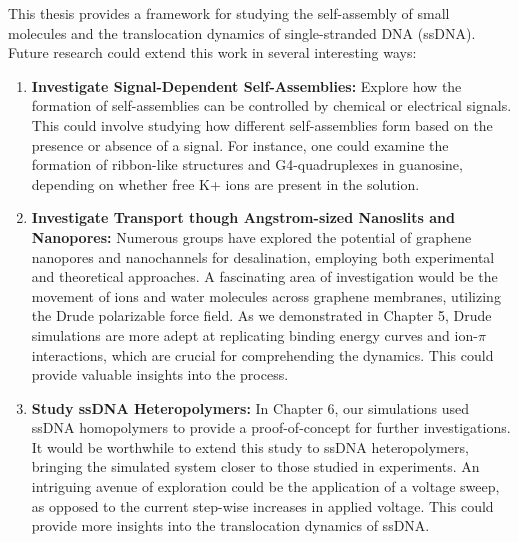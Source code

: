 This thesis provides a framework for studying the self-assembly of small molecules and the translocation dynamics of single-stranded DNA (ssDNA). Future research could extend this work in several interesting ways:
\begin{enumerate}
    \item \textbf{Investigate Signal-Dependent Self-Assemblies:} Explore how the formation of self-assemblies can be controlled by chemical or electrical signals. This could involve studying how different self-assemblies form based on the presence or absence of a signal. For instance, one could examine the formation of ribbon-like structures and G4-quadruplexes in guanosine, depending on whether free K+ ions are present in the solution. 

    \item \textbf{Investigate Transport though Angstrom-sized Nanoslits and Nanopores:} Numerous groups have explored the potential of graphene nanopores and nanochannels for desalination, employing both experimental and theoretical approaches. A fascinating area of investigation would be the movement of ions and water molecules across graphene membranes, utilizing the Drude polarizable force field. As we demonstrated in Chapter 5, Drude simulations are more adept at replicating binding energy curves and ion-$\pi$ interactions, which are crucial for comprehending the dynamics. This could provide valuable insights into the process.

    \item \textbf{Study ssDNA Heteropolymers:} In Chapter 6, our simulations used ssDNA homopolymers to provide a proof-of-concept for further investigations. It would be worthwhile to extend this study to ssDNA heteropolymers, bringing the simulated system closer to those studied in experiments. An intriguing avenue of exploration could be the application of a voltage sweep, as opposed to the current step-wise increases in applied voltage. This could provide more insights into the translocation dynamics of ssDNA.
\end{enumerate}
